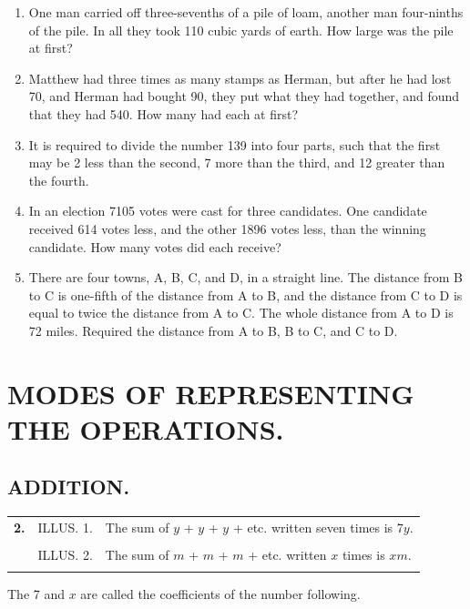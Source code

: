 \documentclass{book}
\begin{document}
\begin{enumerate}
\item One man carried off three-sevenths of a pile of loam,
another man four-ninths of the pile. In all they took 110 cubic
yards of earth. How large was the pile at first?

\item Matthew had three times as many stamps as Herman, but after
he had lost 70, and Herman had bought 90, they put what they had
together, and found that they had 540. How many had each at first?

\item It is required to divide the number 139 into four parts,
such that the first may be 2 less than the second, 7 more than the
third, and 12 greater than the fourth.

\item In an election 7105 votes were cast for three candidates.
One candidate received 614 votes less, and the other 1896 votes
less, than the winning candidate. How many votes did each receive?

\item There are four towns, A, B, C, and D, in a straight line.
The distance from B to C is one-fifth of the distance from A to B,
and the distance from C to D is equal to twice the distance from A
to C. The whole distance from A to D is 72 miles. Required the
distance from A to B, B to C, and C to D.
\end{enumerate}

\section*{MODES OF REPRESENTING THE OPERATIONS.}
\subsection*{ADDITION.}

\begin{tabular}{cll}
\textbf{ 2.} &ILLUS. 1. & The sum of $y$ + $y$ + $y$ + etc.
written
seven times is 7$y$. \\
\\
&ILLUS. 2. & The sum of $m$ + $m$ + $m$ + etc. written $x$ times is $xm$.\\
\\
\end{tabular}

The 7 and $x$ are called the coefficients of the number
following.
\end{document}
